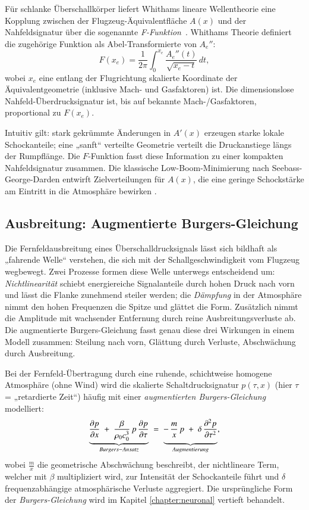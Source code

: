 Für schlanke Überschallkörper liefert Whithams lineare Wellentheorie eine
Kopplung zwischen der Flugzeug-Äquivalentfläche $A(x)$ und der
Nahfeldsignatur über die sogenannte \emph{F-Funktion}~\cite{schall:whitham}.
Whithams Theorie definiert die zugehörige Funktion
als Abel-Transformierte von $A_e''$:
\begin{equation}
    F(x_e)=\frac{1}{2\pi}\int_{0}^{x_e}\frac{A_e''(t)}{\sqrt{x_e-t}}\,dt,
\end{equation}
wobei $x_e$ eine entlang der Flugrichtung skalierte Koordinate
der Äquivalentgeometrie (inklusive Mach- und Gasfaktoren) ist.
Die dimensionslose Nahfeld-Überdrucksignatur ist, bis auf bekannte
Mach-/Gasfaktoren, proportional zu $F(x_e)$.

Intuitiv gilt: stark gekrümmte Änderungen in $A'(x)$ erzeugen starke lokale
Schockanteile; eine „sanft“ verteilte Geometrie verteilt die Druckanstiege
längs der Rumpflänge.
Die $F$-Funktion fasst diese Information zu einer kompakten Nahfeldsignatur zusammen.
Die klassische Low-Boom-Minimierung nach Seebass-George-Darden entwirft
Zielverteilungen für $A(x)$, die eine geringe Schockstärke am Eintritt in
die Atmosphäre bewirken \cite{schall:whitham,schall:seebassgeorge,schall:darden75}.

\subsection{Ausbreitung: Augmentierte Burgers-Gleichung}
Die Fernfeldausbreitung eines Überschalldrucksignals lässt sich bildhaft als
„fahrende Welle“ verstehen, die sich mit der Schallgeschwindigkeit vom
Flugzeug wegbewegt.
Zwei Prozesse formen diese Welle unterwegs entscheidend um:
\emph{Nichtlinearität} schiebt energiereiche Signalanteile durch hohen
Druck nach vorn und lässt die Flanke zunehmend steiler werden;
die \emph{Dämpfung} in der Atmosphäre nimmt den hohen Frequenzen die Spitze
und glättet die Form.
Zusätzlich nimmt die Amplitude mit wachsender Entfernung durch reine
Ausbreitungsverluste ab.
Die augmentierte Burgers-Gleichung fasst genau diese drei
Wirkungen in einem Modell zusammen: Steilung nach vorn, Glättung durch
Verluste, Abschwächung durch Ausbreitung.

Bei der Fernfeld-Übertragung durch eine ruhende, schichtweise homogene
Atmosphäre (ohne Wind) wird die skalierte Schaltdrucksignatur $p(\tau,x)$
(hier $\tau$ = „retardierte Zeit“) häufig mit einer
\emph{augmentierten Burgers-Gleichung} modelliert:
\begin{equation}
  \underbrace{\frac{\partial p}{\partial x}
  \;+\;\frac{\beta}{\rho_0 c_0^{3}}\,p\,\frac{\partial p}{\partial \tau}}_{Burgers-Ansatz}
  \;=\;
  \underbrace{-\,\frac{m}{x}\,p \vphantom{\frac{\beta}{\rho_0 c_0^{3}}}
  \;+\;\delta\,\frac{\partial^2 p}{\partial \tau^2}}_{Augmentierung},
  \label{eq:aug-burgers}
\end{equation}
wobei $\frac{m}{x}$ die geometrische Abschwächung beschreibt, der nichtlineare
Term, welcher mit $\beta$ multipliziert wird, zur Intensität der Schockanteile
führt und $\delta$ frequenzabhängige atmosphärische Verluste aggregiert.
Die ursprüngliche Form der \emph{Burgers-Gleichung} wird im Kapitel
\ref{chapter:neuronal} vertieft behandelt.


